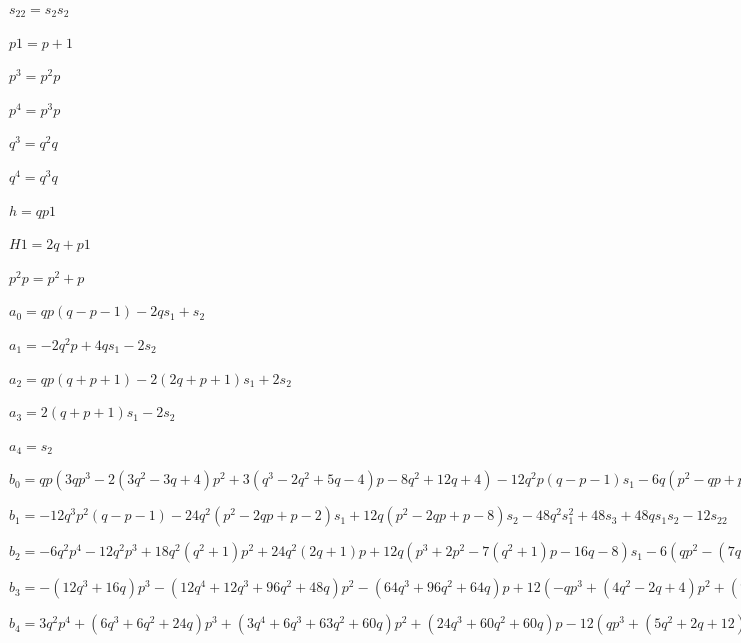 $  s_22 = s_2  s_2$

$  p1 = p + 1$

$  p^3 = p^2  p$

$  p^4 = p^3  p$

$  q^3 = q^2  q$

$  q^4 = q^3  q$

$  h = q  p1$

$  H1 = 2  q + p1$

$  p^2p = p^2 + p$


$  a_0 = q  p  (q - p - 1) - 2  q  s_1 + s_2$

$  a_1 = -2  q^2  p + 4  q  s_1 - 2  s_2$

$  a_2 = q  p  (q + p + 1) - 2  (2  q + p + 1)  s_1 + 2  s_2$

$  a_3 = 2  (q + p + 1)  s_1 - 2  s_2$

$  a_4 = s_2$

$  b_0 = q  p  (3  q  p^3 - 2  (3  q^2 - 3  q + 4)  p^2 + 3  (q^3 - 2  q^2 + 5  q - 4)  p - 8  q^2 + 12  q + 4) - 12  q^2  p  (q - p - 1)  s_1 - 6  q  (p^2 - q  p + p - 4)  s_2 + 12  q^2  s_1^2 - 16  s_3 - 12  q  s_1  s_2 + 3  s_22$

$  b_1 = -12  q^3  p^2  (q - p - 1) - 24  q^2  (p^2 - 2  q  p + p - 2)  s_1 + 12  q  (p^2 - 2  q  p + p - 8)  s_2 - 48  q^2  s_1^2 + 48  s_3 + 48  q  s_1  s_2 - 12  s_22$

$  b_2 = -6  q^2  p^4 - 12  q^2  p^3 + 18  q^2  (q^2 + 1)  p^2 + 24  q^2  (2  q + 1)  p + 12  q  (p^3 + 2  p^2 - 7  (q^2 + 1)  p - 16  q - 8)  s_1 - 6  (q  p^2 - (7  q^2 - q + 8)  p - 40  q - 12)  s_2 + 24  (q  p + 4  q^2 + q + 1)  s_1^2 - 12  (p + 8  q + 1)  s_1  s_2 - 96  s_3 + 24  s_22$

$  b_3 = -(12  q^3 + 16  q)  p^3 - (12  q^4 + 12  q^3 + 96  q^2 + 48  q)  p^2 - (64  q^3 + 96  q^2 + 64  q)  p + 12  (-q  p^3 + (4  q^2 - 2  q + 4)  p^2 + (7  q^3 + 4  q^2 + 31  q + 12)  p + 4  (7  q^2 + 8  q + 4))  s_1 - 48  ((q^2 + 3)  p + 9  q + 5)  s_2 - 24  (3  q  p + 5  q^2 + 3  q + 4)  s_1^2 + 176  s_3 + 12  (3  p + 11  q + 3)  s_1  s_2 - 36  s_22$

$  b_4 = 3  q^2  p^4 + (6  q^3 + 6  q^2 + 24  q)  p^3 + (3  q^4 + 6  q^3 + 63  q^2 + 60  q)  p^2 + (24  q^3 + 60  q^2 + 60  q)  p - 12  (q  p^3 + (5  q^2 + 2  q + 12)  p^2 + (4  q^3 + 5  q^2 + 45  q + 32)  p + 4  (6  q^2 + 11  q + 9))  s_1 + 6  (q  p^2 + (7  q^2 + q + 44)  p + 88  q + 76)  s_2 + 12  (p^2 + 2  (4  q + 1)  p + 8  q^2 + 8  q + 17)  s_1^2 - 12  (4  p + 11  q + 4)  s_1  s_2 - 240  s_3 + 42  s_22$

